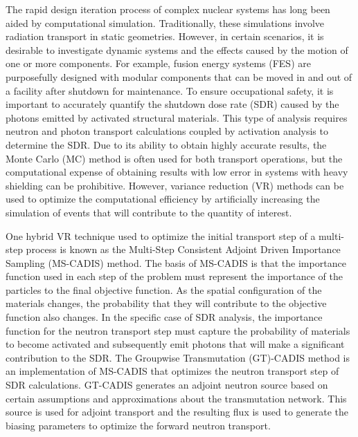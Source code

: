 
\vcinfo{}

The rapid design iteration process of complex nuclear systems has long been
aided by computational simulation.  Traditionally, these simulations
involve radiation transport in static geometries.  However, in certain
scenarios, it is desirable to investigate dynamic systems and the effects caused
by the motion of one or more components.  
For example, fusion energy systems (FES) are purposefully designed with modular components that can be moved in and
out of a facility after shutdown for maintenance. 
To ensure occupational safety, it is important to accurately quantify the
shutdown dose rate (SDR) caused by the photons emitted by activated structural materials.
This type of analysis requires neutron and photon transport calculations coupled by activation analysis to determine the SDR.
Due to its ability to obtain highly accurate results, the Monte Carlo (MC) method is often used for both transport operations, but the computational expense of obtaining results with low
error 
in systems with heavy shielding can be prohibitive.  
However, variance reduction (VR)
methods can be used to optimize the computational efficiency by artificially
increasing the simulation of
events that will contribute to the quantity of interest.

One hybrid VR technique used to optimize the initial transport step of a
multi-step process is known as 
the Multi-Step Consistent Adjoint Driven Importance Sampling
(MS-CADIS) method. 
The basis of MS-CADIS is that the importance %
function used
in each step of the problem must represent the importance of the particles to
the final objective function.  
As the spatial configuration of the materials
changes, the probability that they will contribute to the objective function
also changes.
In the specific case of SDR analysis, 
the importance function for the neutron transport step
must capture the probability of materials to become activated and subsequently emit photons that
will make a significant contribution to the SDR.
The Groupwise Transmutation (GT)-CADIS method 
is an implementation of MS-CADIS
that optimizes the neutron transport step of SDR calculations.
GT-CADIS generates an adjoint
neutron source based on certain assumptions and approximations about the
transmutation network.  
This source is used for adjoint transport and the resulting flux is used to
generate the biasing parameters to optimize the forward neutron transport.


